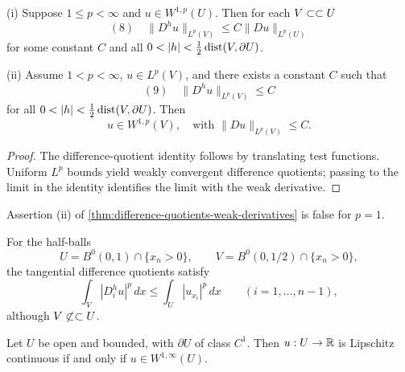 \begin{theorem}
\label{thm:difference-quotients-weak-derivatives}

(i) Suppose $1 \le p < \infty$ and $u \in W^{1,p}(U)$. Then for each $V \subset\subset U$
$$(8) \quad \|D^h u\|_{L^p(V)} \le C\|Du\|_{L^p(U)}$$
for some constant $C$ and all $0 < |h| < \frac{1}{2}\operatorname{dist}(V, \partial U)$.

(ii) Assume $1 < p < \infty$, $u \in L^p(V)$, and there exists a constant $C$ such that
$$(9) \quad \|D^h u\|_{L^p(V)} \le C$$
for all $0 < |h| < \frac{1}{2}\operatorname{dist}(V, \partial U)$. Then
$$u \in W^{1,p}(V), \quad \text{with } \|Du\|_{L^p(V)} \le C.$$
\end{theorem}

\begin{proof}
\sketch The difference-quotient identity follows by translating test functions. Uniform $L^p$ bounds yield weakly convergent difference quotients; passing to the limit in the identity identifies the limit with the weak derivative.
\end{proof}

\begin{remark}[Assertion (ii) fails for $p=1$]
\label{rem:difference-quotient-p1-fails}

Assertion (ii) of \cref{thm:difference-quotients-weak-derivatives} is false for $p=1$.
\end{remark}

\begin{remark}
\label{rem:difference-quotient-half-ball-remark}

For the half-balls
$$U=B^0(0,1)\cap\{x_n>0\},\qquad V=B^0(0,1/2)\cap\{x_n>0\},$$
the tangential difference quotients satisfy
$$\int_V |D_i^h u|^p\,dx \le \int_U |u_{x_i}|^p\,dx \qquad (i=1,\ldots,n-1),$$
although $V\not\subset\subset U$.
\end{remark}

\begin{theorem}
\label{thm:characterization-w1infty-lipschitz}

Let $U$ be open and bounded, with $\partial U$ of class $C^1$. Then $u : U \to \mathbb{R}$ is Lipschitz continuous if and only if $u \in W^{1,\infty}(U)$.
\end{theorem}

